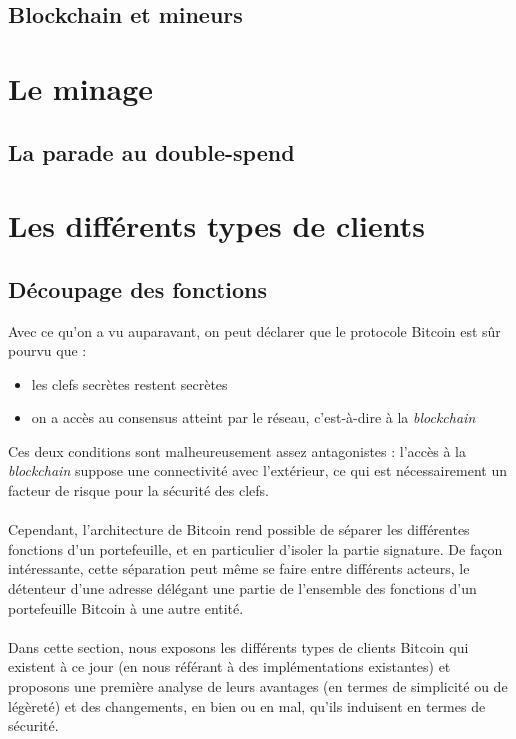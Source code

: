 \documentclass[11pt,a4paper]{article}
\begin{document}
\subsection{Blockchain et mineurs}

\section{Le minage}
\subsection{La parade au double-spend}

\section{Les différents types de clients}
\subsection{Découpage des fonctions}
Avec ce qu'on a vu auparavant, on peut déclarer que le protocole Bitcoin est sûr pourvu que :\begin{itemize}
	\item les clefs secrètes restent secrètes
	\item on a accès au consensus atteint par le réseau, c'est-à-dire à la \textit{blockchain}
\end{itemize}
Ces deux conditions sont malheureusement assez antagonistes : l'accès à la \textit{blockchain} suppose une connectivité avec l'extérieur, ce qui est nécessairement un facteur de risque pour la sécurité des clefs.\\\\
Cependant, l'architecture de Bitcoin rend possible de séparer les différentes fonctions d'un portefeuille, et en particulier d'isoler la partie signature. De façon intéressante, cette séparation peut même se faire entre différents acteurs, le détenteur d'une adresse délégant une partie de l'ensemble des fonctions d'un portefeuille Bitcoin à une autre entité.\\\\
Dans cette section, nous exposons les différents types de clients Bitcoin qui existent à ce jour (en nous référant à des implémentations existantes) et proposons une première analyse de leurs avantages (en termes de simplicité ou de légèreté) et des changements, en bien ou en mal, qu'ils induisent en termes de sécurité.
\end{document}
